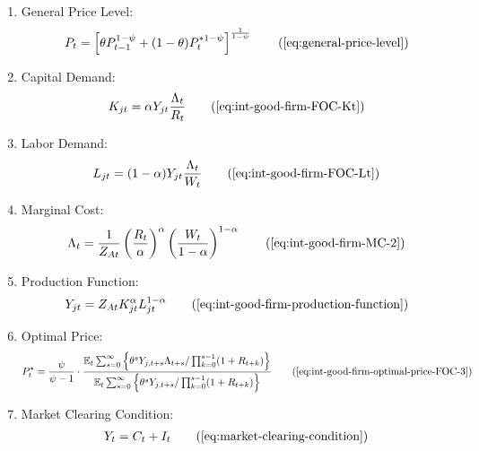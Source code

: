 \documentclass[
thesis.tex
]{subfiles}
\begin{document}
{\begin{itemize}
\begin{enumerate}
				\item General Price Level:
				\begin{align}
					P_t = \left[ \theta P_{t-1}^{1-\psi} + (1-\theta) P_t^{\ast 1-\psi} \right]^\frac{1}{1-\psi}
					\tag{\ref{eq:general-price-level}}
				\end{align}
				
				\item Capital Demand:
				\begin{align}
					K_{jt} = \alpha Y_{jt} \frac{\Lambda_t}{R_t}
					\tag{\ref{eq:int-good-firm-FOC-Kt}}
				\end{align}
				
				\item Labor Demand:
				\begin{align}
					L_{jt} = (1-\alpha) Y_{jt} \frac{\Lambda_t}{W_t}
					\tag{\ref{eq:int-good-firm-FOC-Lt}}
				\end{align}
				
				
				\item Marginal Cost:
				\begin{align}
					\Lambda_t = \frac{1}{Z_{At}} \left( \frac{R_t}{\alpha} \right)^{\alpha} \left( \frac{W_t}{1-\alpha} \right)^{1-\alpha}
					\tag{\ref{eq:int-good-firm-MC-2}}
				\end{align}
				
				\item Production Function:
				\begin{align}
					Y_{jt} = Z_{At} K_{jt}^\alpha L_{jt}^{1-\alpha}
					\tag{\ref{eq:int-good-firm-production-function}}
				\end{align}
				
				\item Optimal Price:
				\begin{align}
					P_t^\ast = \frac{\psi}{\psi-1} \cdot \frac{ \E \sum_{s=0}^{\infty} \left\{ \theta^s Y_{j,t+s} \Lambda_{t+s} / \prod_{k=0}^{s-1}(1+R_{t+k}) \right\} } {\E \sum_{s=0}^{\infty} \left\{ \theta^s Y_{j,t+s} / \prod_{k=0}^{s-1}(1 + R_{t+k}) \right\}} \tag{\ref{eq:int-good-firm-optimal-price-FOC-3}}
				\end{align}
				
				\item Market Clearing Condition:
				\begin{align}
					Y_t = C_t + I_t
					\tag{\ref{eq:market-clearing-condition}}
				\end{align}
				

\end{enumerate}
\end{itemize}}
\end{document}
